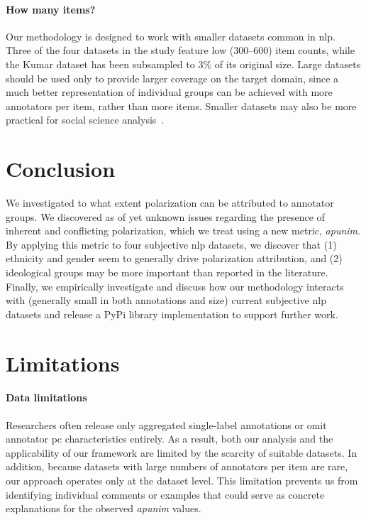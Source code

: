 \documentclass[11pt]{article}
\theoremstyle{definition}
\theoremstyle{plain}
\begin{document}
\paragraph{How many items?} Our methodology is designed to work with smaller datasets common in \ac{nlp}. Three of the four datasets in the study feature low (300--600) item counts, while the Kumar dataset has been subsampled to 3\% of its original size. Large datasets should be used only to provide larger coverage on the target domain, since a much better representation of individual groups can be achieved with more annotators per item, rather than more items. Smaller datasets may also be more practical for social science analysis~\cite{rossi_2024}.


\section{Conclusion}

We investigated to what extent polarization can be attributed to annotator groups. We discovered as of yet unknown issues regarding the presence of inherent and conflicting polarization, which we treat using a new metric, \textit{apunim}. By applying this metric to four subjective \ac{nlp} datasets, we discover that (1) ethnicity and gender seem to generally drive polarization attribution, and (2) ideological groups may be more important than reported in the literature. Finally, we empirically investigate and discuss how our methodology interacts with (generally small in both annotations and size) current subjective \ac{nlp} datasets and release a PyPi library implementation to support further work.



\section*{Limitations}

\paragraph{Data limitations} Researchers often release only aggregated single-label annotations or omit annotator \ac{pc} characteristics entirely. As a result, both our analysis and the applicability of our framework are limited by the scarcity of suitable datasets. In addition, because datasets with large numbers of annotators per item are rare, our approach operates only at the dataset level. This limitation prevents us from identifying individual comments or examples that could serve as concrete explanations for the observed \textit{apunim} values.
\end{document}
